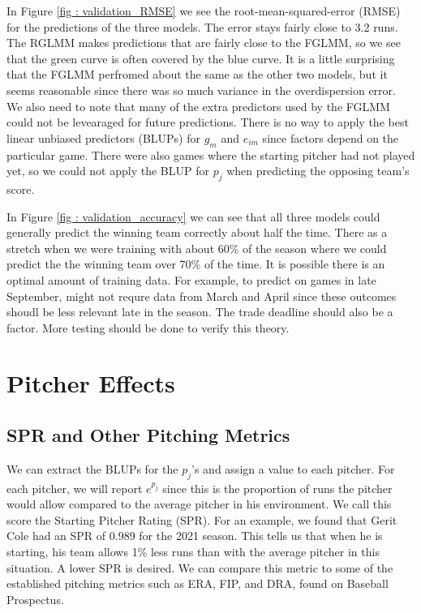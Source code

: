 \documentclass [52pt] {article}
\begin{document}
In Figure \ref{fig : validation_RMSE} we see the root-mean-squared-error (RMSE) for the predictions of the three models.  The error stays fairly close to 3.2 runs.  The RGLMM makes predictions that are fairly close to the FGLMM, so we see that the green curve is often covered by the blue curve.  It is a little surprising that the FGLMM perfromed about the same as the other two models, but it seems reasonable since there was so much variance in the overdispersion error.  We also need to note that many of the extra predictors used by the FGLMM could not be levearaged for future predictions.  There is no way to apply the best linear unbiased predictors (BLUPs) for $g_m$ and $e_{im}$ since factors depend on the particular game.  There were also games where the starting pitcher had not played yet, so we could not apply the BLUP for $p_j$ when predicting the opposing team's score.

In Figure \ref{fig : validation_accuracy} we can see that all three models could generally predict the winning team correctly about half the time.  There as a stretch when we were training with about 60\% of the season where we could predict the the winning team over 70\% of the time.  It is possible there is an optimal amount of training data.  For example, to predict on games in late September, might not requre data from March and April since these outcomes shoudl be less relevant late in the season.  The trade deadline should also be a factor.  More testing should be done to verify this theory.

\section{Pitcher Effects}

\subsection{SPR and Other Pitching Metrics}
We can extract the BLUPs for the $p_j$'s and assign a value to each pitcher.  For each pitcher, we will report $e^{\hat{p}_j}$ since this is the proportion of runs the pitcher would allow compared to the average pitcher in his environment.  We call this score the Starting Pitcher Rating (SPR).  For an example, we found that Gerit Cole had an SPR of 0.989 for the 2021 season.  This tells us that when he is starting, his team allows 1\% less runs than with the average pitcher in this situation.  A lower SPR is desired.  We can compare this metric to some of the established
pitching metrics such as ERA, FIP, and DRA, found on Baseball Prospectus.
\end{document}

